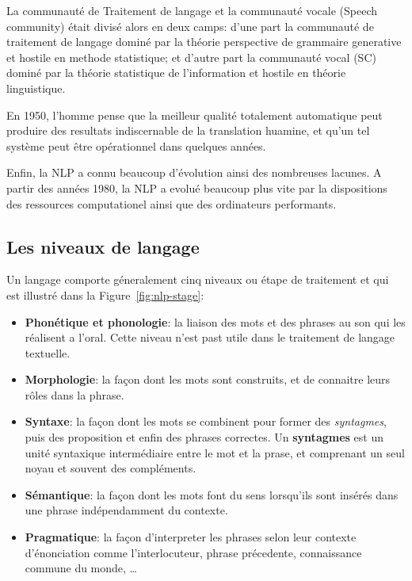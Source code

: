 La communauté de Traitement de langage et la communauté vocale (Speech community) était divisé alors en deux camps: d'une part la communauté de traitement de langage dominé par la théorie perspective de grammaire generative et hostile en methode statistique; et d'autre part la communauté vocal (SC) dominé par la théorie statistique de l'information et hostile en théorie linguistique.

En 1950, l'homme pense que la meilleur qualité totalement automatique peut produire des resultats indiscernable de la translation huamine, et qu'un tel système peut être opérationnel dans quelques années.

Enfin, la NLP a connu beaucoup d'évolution ainsi des nombreuses lacunes. A partir des années 1980, la NLP a evolué beaucoup plus vite par la dispositions des ressources computationel ainsi que des ordinateurs performants.

\subsection{Les niveaux de langage}
Un langage comporte géneralement cinq niveaux ou étape de traitement \citep*{automatic-nlp, handbook-nlp} et qui est illustré dans la Figure~\ref{fig:nlp-stage}:
\begin{itemize}
    \item \textbf{Phonétique et phonologie}: la liaison des mots et des phrases au son qui les réalisent a l'oral. Cette niveau n'est past utile dans le traitement de langage textuelle.
    \item \textbf{Morphologie}: la façon dont les mots sont construits, et de connaitre leurs rôles dans la phrase.
    \item \textbf{Syntaxe}: la façon dont les mots se combinent pour former des \textit{syntagmes}, puis des proposition et enfin des phrases correctes. Un \textbf{syntagmes} est un unité syntaxique intermédiaire entre le mot et la prase, et comprenant un seul noyau et souvent des compléments.
    \item \textbf{Sémantique}: la façon dont les mots font du sens lorsqu'ils sont insérés dans une phrase indépendamment du contexte.
    \item \textbf{Pragmatique}: la façon d'interpreter les phrases selon leur contexte d'énonciation comme l'interlocuteur, phrase précedente, connaissance commune du monde, \dots
\end{itemize}


